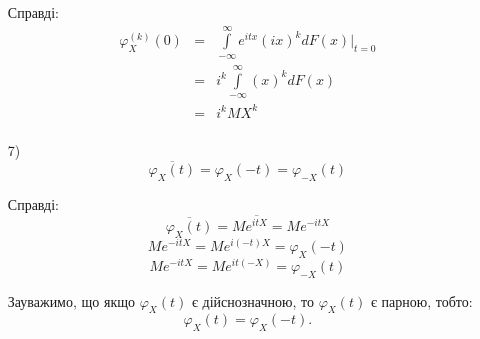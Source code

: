 \begin{theorem}
\begin{enumerate}
        Справді:
        $$\begin{array}{rcl}
            \varphi_X^{(k)} (0) & = & \int\limits_{-\infty}^{\infty} e^{itx} (ix)^k dF(x) \big|_{t=0} \\
            & = & i^k \int\limits_{-\infty}^{\infty} (x)^k dF(x) \\
            & = & i^k MX^k \\
        \end{array}$$

    \item[7)]
        $$\overline{\varphi_X(t)}
        = \varphi_X(-t)
        = \varphi_{-X}(t)$$
        
        Справді:
        $$\overline{\varphi_X(t)} = M\overline{e^{itX}} = M e^{-itX} $$
        $$M e^{-itX} = M e^{i(-t)X} = \varphi_X(-t)$$
        $$M e^{-itX} = M e^{it(-X)} = \varphi_{-X}(t)$$
        
        Зауважимо, що якщо $\varphi_{X}(t)$ є дійснозначною, то
        $\varphi_{X}(t)$ є парною, тобто:
        $$\varphi_{X}(t) = \varphi_{X}(-t).$$
\end{enumerate}
\end{theorem}


